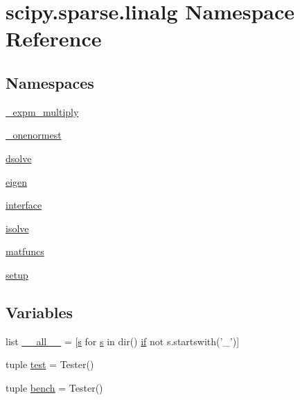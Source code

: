 \hypertarget{namespacescipy_1_1sparse_1_1linalg}{}\section{scipy.\+sparse.\+linalg Namespace Reference}
\label{namespacescipy_1_1sparse_1_1linalg}
\subsection*{Namespaces}
\begin{DoxyCompactItemize}
\item 
 \hyperlink{namespacescipy_1_1sparse_1_1linalg_1_1__expm__multiply}{\+\_\+expm\+\_\+multiply}
\item 
 \hyperlink{namespacescipy_1_1sparse_1_1linalg_1_1__onenormest}{\+\_\+onenormest}
\item 
 \hyperlink{namespacescipy_1_1sparse_1_1linalg_1_1dsolve}{dsolve}
\item 
 \hyperlink{namespacescipy_1_1sparse_1_1linalg_1_1eigen}{eigen}
\item 
 \hyperlink{namespacescipy_1_1sparse_1_1linalg_1_1interface}{interface}
\item 
 \hyperlink{namespacescipy_1_1sparse_1_1linalg_1_1isolve}{isolve}
\item 
 \hyperlink{namespacescipy_1_1sparse_1_1linalg_1_1matfuncs}{matfuncs}
\item 
 \hyperlink{namespacescipy_1_1sparse_1_1linalg_1_1setup}{setup}
\end{DoxyCompactItemize}
\subsection*{Variables}
\begin{DoxyCompactItemize}
\item 
list \hyperlink{namespacescipy_1_1sparse_1_1linalg_a847b0785b69df93bf6d9be6995ec41fe}{\+\_\+\+\_\+all\+\_\+\+\_\+} = \mbox{[}\hyperlink{indexexpr_8h_ae024b0db549122b44c349ae28ec990dc}{s} for \hyperlink{indexexpr_8h_ae024b0db549122b44c349ae28ec990dc}{s} in dir() \hyperlink{minmax_8h_a30a0ee9fee303f01d9c5e6f669e0dfe9}{if} not s.\+startswith('\+\_\+')\mbox{]}
\item 
tuple \hyperlink{namespacescipy_1_1sparse_1_1linalg_a9abd810c68cd7b171e52e0bcdec26007}{test} = Tester()
\item 
tuple \hyperlink{namespacescipy_1_1sparse_1_1linalg_ad7af8cc0f32f0c3ad9aa9a5146ead92e}{bench} = Tester()
\end{DoxyCompactItemize}


